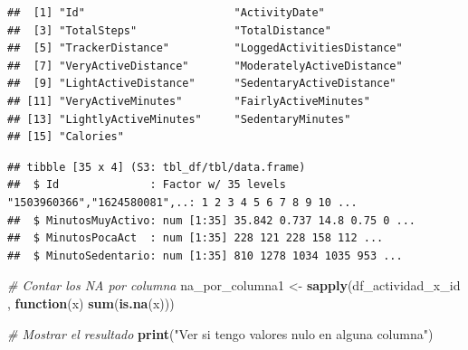 \documentclass[
]{article}
\newenvironment{Shaded}{\begin{snugshade}}{\end{snugshade}}
\newcommand{\AttributeTok}[1]{\textcolor[rgb]{0.13,0.29,0.53}{#1}}
\newcommand{\CommentTok}[1]{\textcolor[rgb]{0.56,0.35,0.01}{\textit{#1}}}
\newcommand{\ControlFlowTok}[1]{\textcolor[rgb]{0.13,0.29,0.53}{\textbf{#1}}}
\newcommand{\FunctionTok}[1]{\textcolor[rgb]{0.13,0.29,0.53}{\textbf{#1}}}
\newcommand{\NormalTok}[1]{#1}
\newcommand{\OtherTok}[1]{\textcolor[rgb]{0.56,0.35,0.01}{#1}}
\newcommand{\SpecialCharTok}[1]{\textcolor[rgb]{0.81,0.36,0.00}{\textbf{#1}}}
\newcommand{\StringTok}[1]{\textcolor[rgb]{0.31,0.60,0.02}{#1}}
\begin{document}
\begin{verbatim}
##  [1] "Id"                       "ActivityDate"            
##  [3] "TotalSteps"               "TotalDistance"           
##  [5] "TrackerDistance"          "LoggedActivitiesDistance"
##  [7] "VeryActiveDistance"       "ModeratelyActiveDistance"
##  [9] "LightActiveDistance"      "SedentaryActiveDistance" 
## [11] "VeryActiveMinutes"        "FairlyActiveMinutes"     
## [13] "LightlyActiveMinutes"     "SedentaryMinutes"        
## [15] "Calories"
\end{verbatim}

\begin{Shaded}
\end{Shaded}

\begin{verbatim}
## tibble [35 x 4] (S3: tbl_df/tbl/data.frame)
##  $ Id              : Factor w/ 35 levels "1503960366","1624580081",..: 1 2 3 4 5 6 7 8 9 10 ...
##  $ MinutosMuyActivo: num [1:35] 35.842 0.737 14.8 0.75 0 ...
##  $ MinutosPocaAct  : num [1:35] 228 121 228 158 112 ...
##  $ MinutoSedentario: num [1:35] 810 1278 1034 1035 953 ...
\end{verbatim}

\begin{Shaded}
\begin{Highlighting}[]
\CommentTok{\# Contar los NA por columna}
\NormalTok{na\_por\_columna1 }\OtherTok{\textless{}{-}} \FunctionTok{sapply}\NormalTok{(df\_actividad\_x\_id , }\ControlFlowTok{function}\NormalTok{(x) }\FunctionTok{sum}\NormalTok{(}\FunctionTok{is.na}\NormalTok{(x)))}

\CommentTok{\# Mostrar el resultado}
\FunctionTok{print}\NormalTok{(}\StringTok{"Ver si tengo valores nulo en alguna columna"}\NormalTok{)}
\end{Highlighting}
\end{Shaded}
\end{document}
